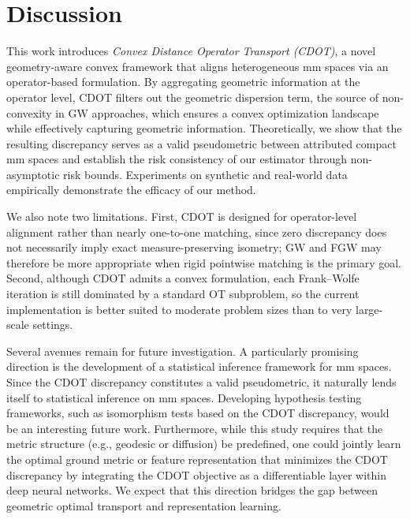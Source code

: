 \documentclass{article}
\theoremstyle{plain}
\theoremstyle{definition}
\theoremstyle{remark}
\begin{document}
\section{Discussion}\label{sec:Discussion}

This work introduces \emph{Convex Distance Operator Transport (CDOT)}, a novel geometry-aware convex framework that aligns heterogeneous mm spaces via an operator-based formulation. By aggregating geometric information at the operator level, CDOT filters out the geometric dispersion term, the source of non-convexity in GW approaches, which ensures a convex optimization landscape while effectively capturing geometric information. Theoretically, we show that the resulting discrepancy serves as a valid pseudometric between attributed compact mm spaces and establish the risk consistency of our estimator through non-asymptotic risk bounds. Experiments on synthetic and real-world data empirically demonstrate the efficacy of our method.

We also note two limitations. First, CDOT is designed for operator-level alignment rather than nearly one-to-one matching, since zero discrepancy does not necessarily imply exact measure-preserving isometry; GW and FGW may therefore be more appropriate when rigid pointwise matching is the primary goal. Second, although CDOT admits a convex formulation, each Frank--Wolfe iteration is still dominated by a standard OT subproblem, so the current implementation is better suited to moderate problem sizes than to very large-scale settings.

Several avenues remain for future investigation. A particularly promising direction is the development of a statistical inference framework for mm spaces.
Since the CDOT discrepancy constitutes a valid pseudometric, it naturally lends itself to statistical inference on mm spaces. Developing hypothesis testing frameworks, such as isomorphism tests based on the CDOT discrepancy, would be an interesting future work.
Furthermore, while this study requires that the metric structure (e.g., geodesic or diffusion) be predefined, one could jointly learn the optimal ground metric or feature representation that minimizes the CDOT discrepancy by integrating the CDOT objective as a differentiable layer within deep neural networks. We expect that this direction bridges the gap between geometric optimal transport and representation learning.
\end{document}
